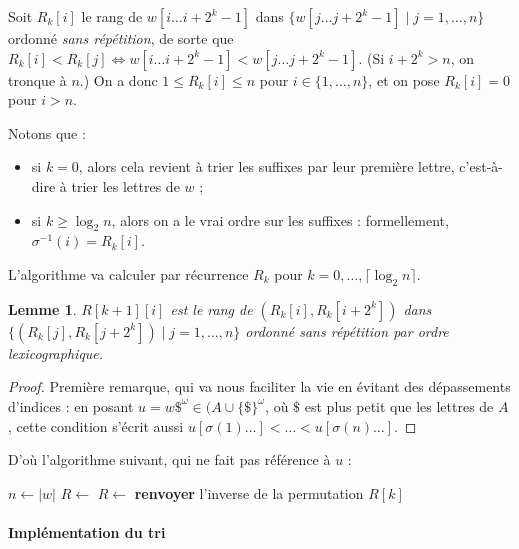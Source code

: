 \documentclass[a4paper, 11pt]{article}
\newtheorem*{lemma}{Lemme}
\begin{document}
Soit $R_k[i]$ le rang de $w[i \ldots i + 2^k - 1]$ dans $\{ w[j \ldots j + 2^k -
1] \mid j = 1, \ldots, n \}$ ordonné \emph{sans répétition}, de sorte que
$R_k[i] < R_k[j] \Leftrightarrow w[i \ldots i + 2^k - 1] < w[j \ldots j + 2^k -
1]$. (Si $i + 2^k > n$, on tronque à $n$.) On a donc $1 \leq R_k[i] \leq n$ pour
$i \in \{1, \ldots, n\}$, et on pose $R_k[i] = 0$ pour $i > n$.

Notons que :
\begin{itemize}
\item si $k = 0$, alors cela revient à trier les suffixes par leur première
  lettre, c'est-à-dire à trier les lettres de $w$ ;
\item si $k \geq \log_2 n$, alors on a le vrai ordre sur les suffixes :
  formellement, $\sigma^{-1}(i) = R_k[i]$.
\end{itemize}
L'algorithme va calculer par récurrence $R_k$ pour $k = 0, \ldots, \lceil
\log_2 n \rceil$.

\begin{lemma}
  $R[k+1][i]$ est le rang de $(R_k[i], R_k[i+2^k])$ dans $\{ (R_k[j],
  R_k[j+2^k]) \mid j = 1, \ldots, n \}$ ordonné sans répétition par ordre
  lexicographique.
\end{lemma}
\begin{proof}
Première remarque, qui va nous faciliter la vie en évitant des dépassements
d'indices : en posant $u = w\$^\omega \in (A \cup \{\$\}^\omega$, où $ \$ $ est
plus petit que les lettres de $A$, cette condition s'écrit aussi
$u[\sigma(1)\ldots] < \ldots < u[\sigma(n)\ldots]$.
\end{proof}

D'où l'algorithme suivant, qui ne fait pas référence à $u$ :

\begin{algorithm}
\begin{algorithmic}
  \State $n \gets |w|$
  \State $R \gets $ 
  \State $R \gets $ 
  \EndFor
  \State \textbf{renvoyer} l'inverse de la permutation $R[k]$
  \EndProcedure
\end{algorithmic}
\end{algorithm}



\paragraph{Implémentation du tri}
\end{document}
